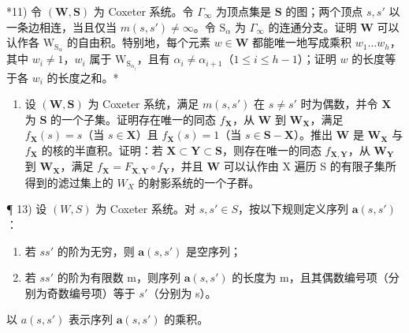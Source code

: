 *11) 令 \((\mathbf{W},\mathbf{S})\) 为 Coxeter 系统。令 \(\Gamma_{\infty}\) 为顶点集是 \(\mathbf{S}\) 的图；两个顶点 \(s,s'\) 以一条边相连，当且仅当 \(m(s,s')\neq \infty\)。令 \(\mathrm{S}_{\alpha}\) 为 \(\Gamma_{\infty}\) 的连通分支。证明 \(\mathbf{W}\) 可以认作各 \(\mathrm{W}_{\mathrm{S}_{\alpha}}\) 的自由积。特别地，每个元素 \(w\in \mathbf{W}\) 都能唯一地写成乘积 \(w_{1}\ldots w_{h}\)，其中 \(w_{i}\neq 1\)，\(w_{i}\) 属于 \(\mathrm{W}_{\mathrm{S}_{\alpha_i}}\)，且有 \(\alpha_{i}\neq \alpha_{i + 1}\)（\(1\leqslant i\leqslant h - 1\)）；证明 \(w\) 的长度等于各 \(w_i\) 的长度之和。*

\begin{enumerate}
\def\labelenumi{\arabic{enumi})}
\setcounter{enumi}{11}
\tightlist
\item
  设 \((\mathbf{W},\mathbf{S})\) 为 Coxeter 系统，满足 \(m(s,s')\) 在 \(s\neq s'\) 时为偶数，并令 \(\mathbf{X}\) 为 \(\mathbf{S}\) 的一个子集。证明存在唯一的同态 \(f_{\mathbf{X}}\)，从 \(\mathbf{W}\) 到 \(\mathbf{W}_{\mathbf{X}}\)，满足 \(f_{\mathbf{X}}(s) = s\)（当 \(s\in \mathbf{X}\)）且 \(f_{\mathbf{X}}(s) = 1\)（当 \(s\in \mathbf{S} - \mathbf{X}\)）。推出 \(\mathbf{W}\) 是 \(\mathbf{W}_{\mathbf{X}}\) 与 \(f_{\mathbf{X}}\) 的核的半直积。证明：若 \(\mathbf{X}\subset \mathbf{Y}\subset \mathbf{S}\)，则存在唯一的同态 \(f_{\mathbf{X},\mathbf{Y}}\)，从 \(\mathbf{W}_{\mathbf{Y}}\) 到 \(\mathbf{W}_{\mathbf{X}}\)，满足 \(f_{\mathbf{X}} = F_{\mathbf{X},\mathbf{Y}}\circ f_{\mathbf{Y}}\)，并且 \(\mathbf{W}\) 可以认作由 X 遍历 S 的有限子集所得到的滤过集上的 \(W_{X}\) 的射影系统的一个子群。
\end{enumerate}

¶ 13) 设 \((W, S)\) 为 Coxeter 系统。对 \(s, s' \in S\)，按以下规则定义序列 \(\mathbf{a}(s, s')\)：

\begin{enumerate}
\def\labelenumi{(\roman{enumi})}
\item
  若 \(ss'\) 的阶为无穷，则 \(\mathbf{a}(s, s')\) 是空序列；
\item
  若 \(ss'\) 的阶为有限数 m，则序列 \(\mathbf{a}(s, s')\) 的长度为 m，且其偶数编号项（分别为奇数编号项）等于 \(s'\)（分别为 s）。
\end{enumerate}

以 \(a(s, s')\) 表示序列 \(\mathbf{a}(s, s')\) 的乘积。

